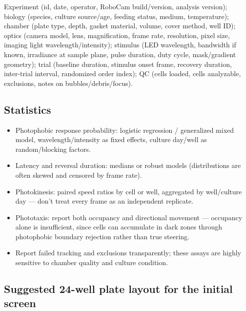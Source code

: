 \documentclass[
]{article}
\providecommand{\tightlist}{%
  \setlength{\itemsep}{0pt}\setlength{\parskip}{0pt}}
\begin{document}
Experiment (id, date, operator, RoboCam build/version, analysis
version); biology (species, culture source/age, feeding status, medium,
temperature); chamber (plate type, depth, gasket material, volume, cover
method, well ID); optics (camera model, lens, magnification, frame rate,
resolution, pixel size, imaging light wavelength/intensity); stimulus
(LED wavelength, bandwidth if known, irradiance at sample plane, pulse
duration, duty cycle, mask/gradient geometry); trial (baseline duration,
stimulus onset frame, recovery duration, inter-trial interval,
randomized order index); QC (cells loaded, cells analyzable, exclusions,
notes on bubbles/debris/focus).

\hypertarget{statistics}{%
\subsection{Statistics}\label{statistics}}

\begin{itemize}
\tightlist
\item
  Photophobic response probability: logistic regression / generalized
  mixed model, wavelength/intensity as fixed effects, culture day/well
  as random/blocking factors.
\item
  Latency and reversal duration: medians or robust models (distributions
  are often skewed and censored by frame rate).
\item
  Photokinesis: paired speed ratios by cell or well, aggregated by
  well/culture day --- don't treat every frame as an independent
  replicate.
\item
  Phototaxis: report both occupancy and directional movement ---
  occupancy alone is insufficient, since cells can accumulate in dark
  zones through photophobic boundary rejection rather than true
  steering.
\item
  Report failed tracking and exclusions transparently; these assays are
  highly sensitive to chamber quality and culture condition.
\end{itemize}

\hypertarget{suggested-24-well-plate-layout-for-the-initial-screen}{%
\subsection{Suggested 24-well plate layout for the initial
screen}\label{suggested-24-well-plate-layout-for-the-initial-screen}}
\end{document}

